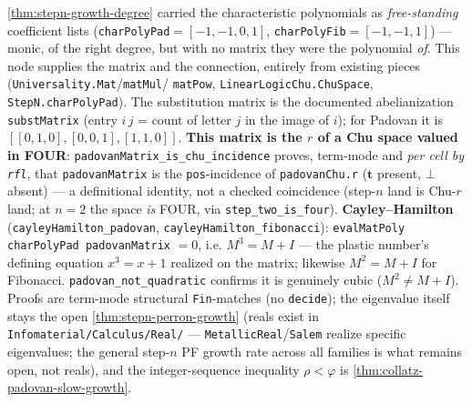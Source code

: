 \begin{theorem}\label{thm:stepn-chu-cayley-hamilton}\leanok{}
\cref{thm:stepn-growth-degree} carried the characteristic polynomials as \emph{free-standing}
coefficient lists (\texttt{charPolyPad}$=[-1,-1,0,1]$, \texttt{charPolyFib}$=[-1,-1,1]$) --- monic,
of the right degree, but with no matrix they were the polynomial \emph{of}. This node supplies the
matrix and the connection, entirely from existing pieces (\texttt{Universality.Mat}/\texttt{matMul}/
\texttt{matPow}, \texttt{LinearLogicChu.ChuSpace}, \texttt{StepN.charPolyPad}). The substitution
matrix is the documented abelianization \texttt{substMatrix} (entry $i\,j$ = count of letter $j$ in
the image of $i$); for Padovan it is $[[0,1,0],[0,0,1],[1,1,0]]$. \textbf{This matrix is the $r$ of
a Chu space valued in FOUR}: \texttt{padovanMatrix\_is\_chu\_incidence} proves, term-mode and
\emph{per cell by \texttt{rfl}}, that \texttt{padovanMatrix} is the \texttt{pos}-incidence of
\texttt{padovanChu.r} ($\mathbf t$ present, $\bot$ absent) --- a definitional identity, not a
checked coincidence (step-$n$ land is Chu-$r$ land; at $n=2$ the space \emph{is} FOUR, via
\texttt{step\_two\_is\_four}). \textbf{Cayley--Hamilton} (\texttt{cayleyHamilton\_padovan},
\texttt{cayleyHamilton\_fibonacci}): \texttt{evalMatPoly charPolyPad padovanMatrix} $=0$, i.e.
$M^3=M+I$ --- the plastic number's defining equation $x^3=x+1$ realized on the matrix; likewise
$M^2=M+I$ for Fibonacci. \texttt{padovan\_not\_quadratic} confirms it is genuinely cubic
($M^2\neq M+I$). Proofs are term-mode structural \texttt{Fin}-matches (no \texttt{decide}); the
eigenvalue itself stays the open \cref{thm:stepn-perron-growth} (reals exist in \texttt{Infomaterial/Calculus/Real/}
--- \texttt{MetallicReal}/\texttt{Salem} realize specific eigenvalues; the general step-$n$ PF growth
rate across all families is what remains open, not reals), and the
integer-sequence inequality $\rho<\varphi$ is \cref{thm:collatz-padovan-slow-growth}.
\end{theorem}
